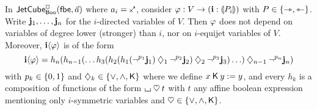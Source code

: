 \documentclass[a4paper]{memoir}
\begin{document}
\begin{lemma} \label{thm:char-jet-cube-to-line}
	In $\mathsf{JetCube}^{\Box}_{\mathsf{Boo}}({\mathsf{fbe}},\vec a)$ where $a_i = \ypolar$, consider $\varphi : V \to (\mathbf{i} : {\llparenthesis P_i \rrparenthesis})$ with $P \in \mathopen{}\left\{ \rightarrowtriangle, \leftarrowtriangle \right\}\mathclose{}$.
	Write $\mathbf{j}_1, \ldots, \mathbf{j}_n$ for the $i$-directed variables of $V$.
	Then $\varphi$ does not depend on variables of degree lower (stronger) than $i$, nor on $i$-equijet variables of $V$.
	Moreover, $\mathbf{i} \langle \varphi \rangle$ is of the form
	\[
		\mathbf{i} \langle \varphi \rangle = h_n(h_{n-1}(\ldots h_3(h_2(h_1(\lnot^{p_1} \mathbf{j}_1) \mathbin{\diamondsuit}_1 \lnot^{p_2} \mathbf{j}_2) \mathbin{\diamondsuit}_2 \lnot^{p_3} \mathbf{j}_3) \ldots ) \mathbin{\diamondsuit}_{n-1} \lnot^{p_n} \mathbf{j}_n)
	\]
	with $p_k \in \mathopen{}\left\{ 0, 1 \right\}\mathclose{}$ and $\mathbin{\diamondsuit}_k \in \mathopen{}\left\{ {\vee}, {\wedge}, {\mathbin{\mathsf{K}}} \right\}\mathclose{}$ where we define $x \mathbin{\mathsf{K}} y := y$, and every $h_k$ is a composition of functions of the form ${\llcorner\hspace{-.4ex}\lrcorner} \mathbin{\heartsuit} t$ with $t$ any affine boolean expression mentioning only $i$-symmetric variables and ${\mathbin{\heartsuit}} \in \mathopen{}\left\{ {\vee}, {\wedge}, {\mathbin{\mathsf{K}}} \right\}\mathclose{}$.
\end{lemma}
\end{document}
